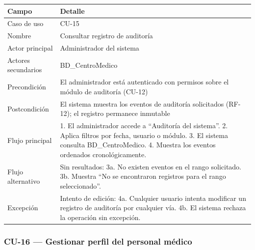\documentclass[11pt,a4paper]{article}
\begin{document}
	\begin{longtable}{p{} p{} }
		
		
		\toprule
		\textbf{Campo} &
		\textbf{Detalle}  \\
		\midrule
		\endhead
		
		Caso de uso & CU-15 \\
		Nombre & Consultar registro de auditoría \\
		Actor principal & Administrador del sistema \\
		Actores secundarios & BD\_CentroMedico \\
		Precondición & El administrador está autenticado con permisos sobre el módulo de auditoría (CU-12) \\
		Postcondición & El sistema muestra los eventos de auditoría solicitados (RF-12); el registro permanece inmutable \\
		Flujo principal & 1. El administrador accede a ``Auditoría del sistema''. 2. Aplica filtros por fecha, usuario o módulo. 3. El sistema consulta BD\_CentroMedico. 4. Muestra los eventos ordenados cronológicamente. \\
		Flujo alternativo & Sin resultados: 3a. No existen eventos en el rango solicitado. 3b. Muestra ``No se encontraron registros para el rango seleccionado''. \\
		Excepción & Intento de edición: 4a. Cualquier usuario intenta modificar un registro de auditoría por cualquier vía. 4b. El sistema rechaza la operación sin excepción. \\
		\bottomrule
	\end{longtable}
	
	\subsubsection{CU-16 --- Gestionar perfil del personal médico}
	
\end{document}
